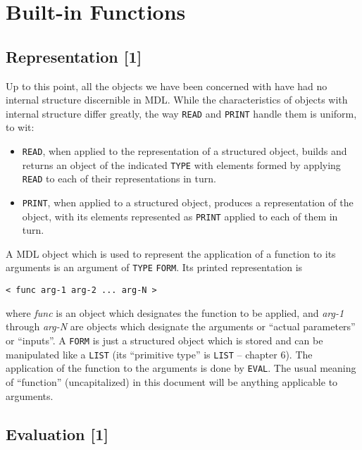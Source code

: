\documentclass[a4paper]{scrbook}
\begin{document}
\chapter{Built-in Functions}\label{chapter-3.-built-in-functions}

\section{Representation {[}1{]}}\label{representation-1}

Up to this point, all the objects we have been concerned with have had no internal structure discernible in MDL. While the
characteristics of objects with internal structure differ greatly, the way \texttt{READ} and \texttt{PRINT} handle them is
uniform, to wit:

\begin{itemize}
\item
  \texttt{READ}, when applied to the representation of a structured object, builds and returns an object of the indicated
  \texttt{TYPE} with elements formed by applying \texttt{READ} to each of their representations in turn.
\item
  \texttt{PRINT}, when applied to a structured object, produces a representation of the object, with its elements
  represented as \texttt{PRINT} applied to each of them in turn.
\end{itemize}

A MDL object which is used to represent the application of a function to its arguments is an argument of \texttt{TYPE}
\texttt{FORM}. Its printed representation is

\begin{verbatim}
< func arg-1 arg-2 ... arg-N >
\end{verbatim}

where \emph{func} is an object which designates the function to be applied, and
\emph{arg-1} through \emph{arg-N} are objects which designate the arguments or ``actual parameters'' or ``inputs''. A
\texttt{FORM} is just a structured object which is stored and can be manipulated like a \texttt{LIST} (its ``primitive
type'' is \texttt{LIST} -- chapter 6). The application of the function to the arguments is done by \texttt{EVAL}. The usual
meaning of ``function'' (uncapitalized) in this document will be anything applicable to arguments.

\section{Evaluation {[}1{]}}\label{evaluation-1}
\end{document}
